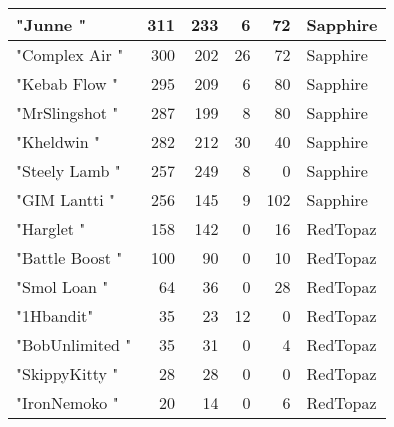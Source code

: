 \documentclass{article}
\begin{document}
\begin{table}[htbp]
\begin{tabular}{|l|r|r|r|r|l|}
"Junne " & 311 & 233 & 6 & 72 & Sapphire \\ \hline
"Complex Air " & 300 & 202 & 26 & 72 & Sapphire \\ \hline
"Kebab Flow " & 295 & 209 & 6 & 80 & Sapphire \\ \hline
"MrSlingshot " & 287 & 199 & 8 & 80 & Sapphire \\ \hline
"Kheldwin " & 282 & 212 & 30 & 40 & Sapphire \\ \hline
"Steely Lamb " & 257 & 249 & 8 & 0 & Sapphire \\ \hline
"GIM Lantti " & 256 & 145 & 9 & 102 & Sapphire \\ \hline
"Harglet " & 158 & 142 & 0 & 16 & RedTopaz \\ \hline
"Battle Boost " & 100 & 90 & 0 & 10 & RedTopaz \\ \hline
"Smol Loan " & 64 & 36 & 0 & 28 & RedTopaz \\ \hline
"1Hbandit" & 35 & 23 & 12 & 0 & RedTopaz \\ \hline
"BobUnlimited " & 35 & 31 & 0 & 4 & RedTopaz \\ \hline
"SkippyKitty " & 28 & 28 & 0 & 0 & RedTopaz \\ \hline
"IronNemoko " & 20 & 14 & 0 & 6 & RedTopaz \\ \hline
\end{tabular}
\end{table}
\end{document}

